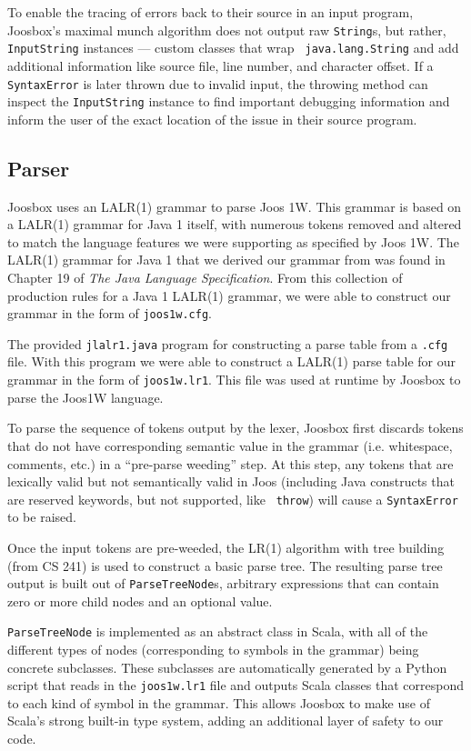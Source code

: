 \documentclass[letterpaper]{article}
\begin{document}
  To enable the tracing of errors back to their source in an input program,
  Joosbox's maximal munch algorithm does not output raw {\tt String}s, but
  rather, {\tt InputString} instances --- custom classes that wrap {\tt
  java.lang.String} and add additional information like source file, line
  number, and character offset. If a {\tt SyntaxError} is later thrown due to
  invalid input, the throwing method can inspect the {\tt InputString}
  instance to find important debugging information and inform the user of the
  exact location of the issue in their source program.

  \subsection{Parser}

  Joosbox uses an LALR(1) grammar to parse Joos 1W. This grammar is based on a
  LALR(1) grammar for Java 1 itself, with numerous tokens removed and altered to
  match the language features we were supporting as specified by Joos 1W. The
  LALR(1) grammar for Java 1 that we derived our grammar from was found in
  Chapter 19 of {\em The Java Language Specification}. From this collection of
  production rules for a Java 1 LALR(1) grammar, we were able to construct our
  grammar in the form of {\tt joos1w.cfg}.

  The provided {\tt jlalr1.java} program for constructing a parse table from a
  {\tt.cfg} file. With this program we were able to construct a LALR(1) parse
  table for our grammar in the form of {\tt joos1w.lr1}. This file was used at
  runtime by Joosbox to parse the Joos1W language.

  To parse the sequence of tokens output by the lexer, Joosbox first discards
  tokens that do not have corresponding semantic value in the grammar (i.e.
  whitespace, comments, etc.) in a ``pre-parse weeding'' step. At this step, any
  tokens that are lexically valid but not semantically valid in Joos (including
  Java constructs that are reserved keywords, but not supported, like {\tt
  throw}) will cause a {\tt SyntaxError} to be raised.

  Once the input tokens are pre-weeded, the LR(1) algorithm with tree building
  (from CS 241) is used to construct a basic parse tree. The resulting parse
  tree output is built out of {\tt ParseTreeNode}s, arbitrary expressions that
  can contain zero or more child nodes and an optional value.

  {\tt ParseTreeNode} is implemented as an abstract class in Scala, with all of
  the different types of nodes (corresponding to symbols in the grammar) being
  concrete subclasses. These subclasses are automatically generated by a Python
  script that reads in the {\tt joos1w.lr1} file and outputs Scala classes that
  correspond to each kind of symbol in the grammar. This allows Joosbox to make
  use of Scala's strong built-in type system, adding an additional layer of
  safety to our code.
\end{document}
